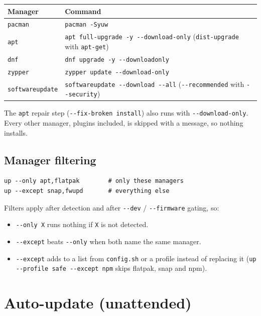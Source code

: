 \documentclass[11pt,a4paper]{article}
\begin{document}
\begin{center}
\begin{tabular}{@{}ll@{}}
\toprule
\textbf{Manager} & \textbf{Command} \\
\midrule
\texttt{pacman} & \texttt{pacman -Syuw} \\
\texttt{apt}    & \texttt{apt full-upgrade -y -{}-download-only}
                  (\texttt{dist-upgrade} with \texttt{apt-get}) \\
\texttt{dnf}    & \texttt{dnf upgrade -y -{}-downloadonly} \\
\texttt{zypper} & \texttt{zypper update -{}-download-only} \\
\texttt{softwareupdate} & \texttt{softwareupdate -{}-download -{}-all}
                  (\texttt{-{}-recommended} with \texttt{-{}-security}) \\
\bottomrule
\end{tabular}
\end{center}

The \texttt{apt} repair step (\texttt{-{}-fix-broken install}) also runs
with \texttt{-{}-download-only}. Every other manager, plugins included,
is skipped with a message, so nothing installs.

\subsection{Manager filtering}
\begin{lstlisting}[language=bashplus]
up --only apt,flatpak        # only these managers
up --except snap,fwupd       # everything else
\end{lstlisting}

Filters apply after detection and after \texttt{-{}-dev} /
\texttt{-{}-firmware} gating, so:

\begin{itemize}
  \item \texttt{-{}-only X} runs nothing if \texttt{X} is not detected.
  \item \texttt{-{}-except} beats \texttt{-{}-only} when both name the
        same manager.
  \item \texttt{-{}-except} adds to a list from \texttt{config.sh} or a
        profile instead of replacing it (\texttt{up -{}-profile safe
        -{}-except npm} skips flatpak, snap and npm).
\end{itemize}

\section{Auto-update (unattended)}\label{sec:auto}
\end{document}
